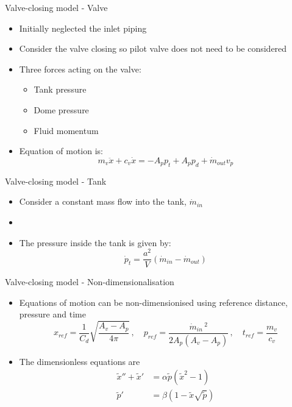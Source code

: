 \documentclass[svgnames,fragile]{beamer}
\begin{document}
\begin{frame}{Valve-closing model - Valve}
\begin{itemize}
    \item<1-> Initially neglected the inlet piping
    \item<2-> Consider the valve closing so pilot valve does not need to be considered
    \item<3-> Three forces acting on the valve:
    \begin{itemize}
        \item<4-> Tank pressure
        \item<5-> Dome pressure
        \item<6-> Fluid momentum
    \end{itemize}
    \item<7-> Equation of motion is:
    \begin{equation*}
        m_v \ddot{x} + c_v \dot{x} = - A_p p_t + A_p p_d + \dot{m}_{out} v_p
    \end{equation*}
\end{itemize}
\end{frame}

\begin{frame}{Valve-closing model - Tank}
\begin{itemize}
    \item<1-> Consider a constant mass flow into the tank, $\dot{m}_{in}$
    \item<2->
    \item<3-> The pressure inside the tank is given by:
    \begin{equation*}
        \dot{p}_t = \frac{a^2}{V} \left( \dot{m}_{in} - \dot{m}_{out} \right)
    \end{equation*}
\end{itemize}
\end{frame}

\begin{frame}{Valve-closing model - Non-dimensionalisation}
\begin{itemize}
    \item<1-> Equations of motion can be non-dimensionised using reference distance, pressure and time
    \begin{equation*}
        x_{ref} = \frac{1}{C_d} \sqrt{\frac{A_v - A_p}{4 \pi}} \, , \quad
        p_{ref} = \frac{\dot{m}_{in}\,^2}{2 A_p \left( A_v - A_p \right)} \, , \quad
        t_{ref} = \frac{m_v}{c_v}
    \end{equation*}
    \item<2-> The dimensionless equations are
    \begin{equation}
    \begin{split}
        \tilde{x}'' + \tilde{x}' &= \alpha \tilde{p} \left( \tilde{x}^2 - 1 \right) \\
        \tilde{p}' &= \beta \left( 1 - \tilde{x} \sqrt{\tilde{p}} \right)
    \end{split}
    \end{equation}
\end{itemize}
\end{frame}
\end{document}

